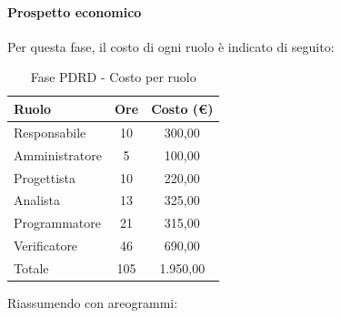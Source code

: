 \documentclass[../PianoProgetto.tex]{subfiles}
\begin{document}
	\paragraph{Prospetto economico}
					Per questa fase, il costo di ogni ruolo è indicato di seguito:
	\begin{table}[h]
		\centering
	
		\begin{tabular}{l * {2}{c}}
			\toprule
			\textbf{Ruolo} & \textbf{Ore} & \textbf{Costo (\euro{})} \\
			\midrule
			Responsabile &	10 & 300,00 \\
			Amministratore & 5 & 100,00 \\
			Progettista & 10 & 220,00 \\
			Analista & 13 & 325,00 \\
			Programmatore & 21 & 315,00 \\
			Verificatore & 46 & 690,00 \\
			\midrule		
			Totale & 105 & 1.950,00 \\
			\bottomrule
		\end{tabular}
		\caption{Fase PDRD - Costo per ruolo}
		\label{tab:fasePDRD_costo}
	\end{table}
\vfill	
	Riassumendo con areogrammi:
\end{document}
